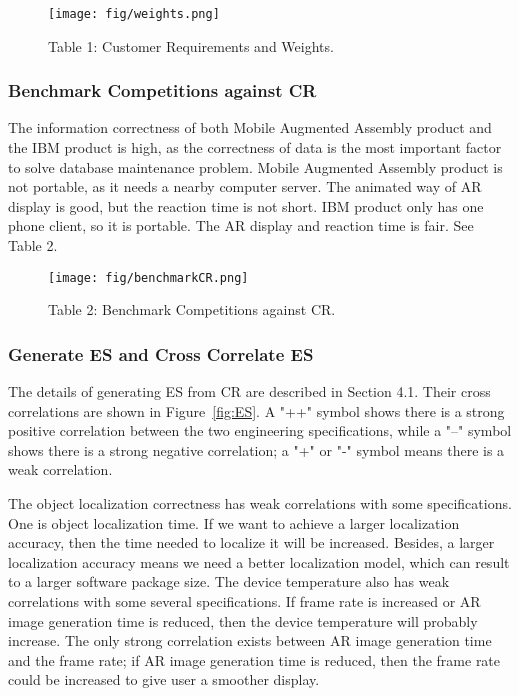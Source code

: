 \documentclass[11pt,a4paper]{article}
\begin{document}
\begin{onehalfspace}
\begin{figure}[H]
    \centering
    \caption*{Table 1: Customer Requirements and Weights.}
    \texttt{[image: fig/weights.png]}
\end{figure}

\subsubsection{Benchmark Competitions against CR}
The information correctness of both Mobile Augmented Assembly product and the IBM product is high, as the correctness of data is the most important factor to solve database maintenance problem. Mobile Augmented Assembly product is not portable, as it needs a nearby computer server. The animated way of AR display is good, but the reaction time is not short. IBM product only has one phone client, so it is portable. The AR display and reaction time is fair. See Table 2.

\begin{figure}[H]
    \centering
    \caption*{Table 2: Benchmark Competitions against CR.}
    \texttt{[image: fig/benchmarkCR.png]}
\end{figure}

\subsubsection{Generate ES and Cross Correlate ES}

The details of generating ES from CR are described in Section 4.1. Their cross correlations are shown in Figure~\ref{fig:ES}. A "++" symbol shows there is a strong positive correlation between the two engineering specifications, while a "--" symbol shows there is a strong negative correlation; a "+" or "-" symbol means there is a weak correlation. 

The object localization correctness has weak correlations with some specifications. One is object localization time. If we want to achieve a larger localization accuracy, then the time needed to localize it will be increased. Besides, a larger localization accuracy means we need a better localization model, which can result to a larger software package size. The device temperature also has weak correlations with some several specifications. If frame rate is increased or AR image generation time is reduced, then the device temperature will probably increase. The only strong correlation exists between AR image generation time and the frame rate; if AR image generation time is reduced, then the frame rate could be increased to give user a smoother display.


\end{onehalfspace}
\end{document}
